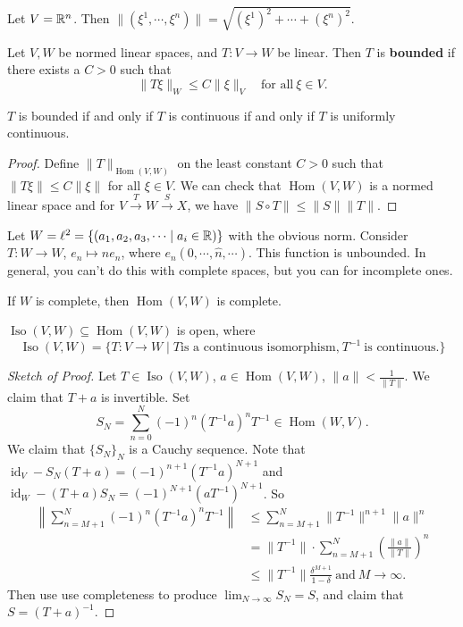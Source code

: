 \begin{example}
    Let $V=\mathbb{R}^n $. Then $\|(\xi^1,\cdots ,\xi^n )\|=\sqrt{(\xi^1)^2+\cdots + (\xi^n )^2} $.
\end{example}
\begin{definition}[]
    Let $V,W$ be normed linear spaces, and $T \colon V \to W$ be linear. Then $T$ is \textbf{bounded} if there exists a $C>0$ such that  \[
    \|T\xi\|_W \leq C \| \xi\|_V \quad \text{for all} \ \xi \in V.
    \] 
\end{definition}
\begin{prop}
    $T$ is bounded if and only if $T$ is continuous if and only if $T$ is uniformly continuous.
\end{prop}
\begin{proof}
    Define $\|T\|_{\operatorname{Hom}(V,W)}$ on the least constant $C>0$ such that $\|T\xi\|\leq C \|\xi\|$ for all $\xi \in V$. We can check that $\operatorname{Hom}(V,W)$ is a normed linear space and for $V \overset{T}{\longrightarrow} W \overset{S}{\longrightarrow} X$, we have $\|S \circ T\|\leq \|S\|\|T\|$.
\end{proof}
\begin{example}
    Let $W=\ell^2= \{(a_1,a_2,a_3,\cdots \mid a_i \in \mathbb{R})\}  $ with the obvious norm. Consider $T \colon W \to W$, $e_n  \mapsto ne_n $, where $e_n (0,\cdots ,\hat{n},\cdots )$. This function is unbounded. In general, you can't do this with complete spaces, but you can for incomplete ones.
\end{example}
\begin{lemma}
    If $W$ is complete, then $\operatorname{Hom}(V,W)$ is complete.
\end{lemma}
\begin{prop}
    $\operatorname{Iso}(V,W) \subseteq \operatorname{Hom}(V,W)$ is open, where \[
        \operatorname{Iso}(V,W)= \{T \colon V \to W  \mid T \text{is a continuous isomorphism,} \ T^{-1} \ \text{is continuous.}  \} 
    \] 
\end{prop}
\begin{proof}[Sketch of Proof]
    Let $T \in \operatorname{Iso}(V,W)$, $a \in \operatorname{Hom}(V,W)$, $\| a\|< \frac{1}{\|T\|}$. We claim that $T+a$ is invertible.  Set \[
        S_N = \sum_{n=0}^{N} (-1)^n  (T ^{-1}a)^n  T ^{-1} \in \operatorname{Hom}(W,V).
    \] We claim that $\{S_N\} _N$ is a Cauchy sequence. Note that $\operatorname{id}_V -S_N(T+a)= (-1)^{n+1}(T ^{-1} a)^{N+1}$ and $\operatorname{id}_W-(T+a)S_N=(-1)^{N+1}(aT^{-1})^{N+1}$. So
    \begin{align*}
        \left\|\sum_{n=M+1}^{N} (-1)^n  (T^{-1}a)^n T^{-1}\right\|& \leq \sum_{n=M+1}^{N} \|T^{-1}\|^{n+1}\|a\|^n \\
                                                                &=\|T^{-1}\|\cdot \sum_{n=M+1}^{N} \left( \frac{\|a\|}{\|T\|} \right) ^n \\
                                                                &\leq \|T^{-1}\|\frac{\delta^{M+1}}{1-\delta} \ \text{and} \ M\to \infty.
    \end{align*} Then use use completeness to produce $\lim _{N\to \infty}S_N=S$, and claim that $S=(T+a)^{-1}$.
\end{proof}
